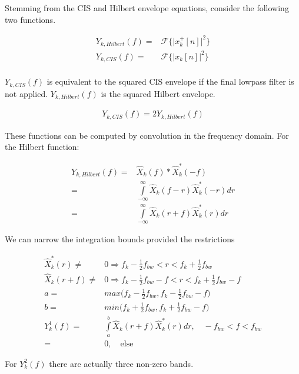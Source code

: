 \documentclass [11pt, proquest,oneside] {ganter_thesis}[2015/03/03]
\begin{document}
Stemming from the CIS and Hilbert envelope equations, consider the following two functions.  

\begin{align}
\label{eq:hilbert_squared}
Y_{k,Hilbert}(f) =& \mathcal{F}\Big\{ \Big| x^+_k[n] \Big|^2  \Big\} \\
\label{eq:cis_squared_prefilter}
Y_{k,CIS}(f) =& \mathcal{F}\Big\{ \Big| x_k[n] \Big|^2  \Big\} \\
\end{align}

$Y_{k,CIS}(f)$ is equivalent to the squared CIS envelope if the final lowpass filter is not applied.  $Y_{k,Hilbert}(f)$ is the squared Hilbert envelope.


\begin{align}
Y_{k,CIS}(f) = 2Y_{k,Hilbert}(f)
\end{align}

These functions can be computed by convolution in the frequency domain.  For the Hilbert function:

\begin{align}
Y_{k,Hilbert}(f) =& \widehat{X}_{k}(f) * \widehat{X}_{k}^*(-f) \\
=& \int\limits_{-\infty}^{\infty} \widehat{X}_{k}(f - r) \widehat{X}_{k}^*(-r)dr \\
=& \int\limits_{-\infty}^{\infty} \widehat{X}_{k}(r + f) \widehat{X}_{k}^*(r)dr
\end{align}

We can narrow the integration bounds provided the restrictions

\begin{align}
\widehat{X}_{k}^*(r) \neq& 0 \Rightarrow  f_k - \frac{1}{2} f_{bw} < r < f_k + \frac{1}{2} f_{bw} \\
\widehat{X}_{k}(r + f) \neq& 0 \Rightarrow  f_k - \frac{1}{2} f_{bw} - f < r < f_k + \frac{1}{2} f_{bw} - f \\
a =& max\Big( f_k - \frac{1}{2} f_{bw},  f_k - \frac{1}{2} f_{bw} - f\Big) \\
b =& min\Big( f_k + \frac{1}{2} f_{bw},  f_k + \frac{1}{2} f_{bw} - f\Big) \\
Y_{k}^1(f) =& \int\limits_{a}^{b} \widehat{X}_{k}(r + f) \widehat{X}_{k}^*(r)dr, \quad -f_{bw} < f < f_{bw} \\
=& 0, \quad \mathrm{else}
\end{align}

For $Y_k^2(f)$ there are actually three non-zero bands.
\end{document}
